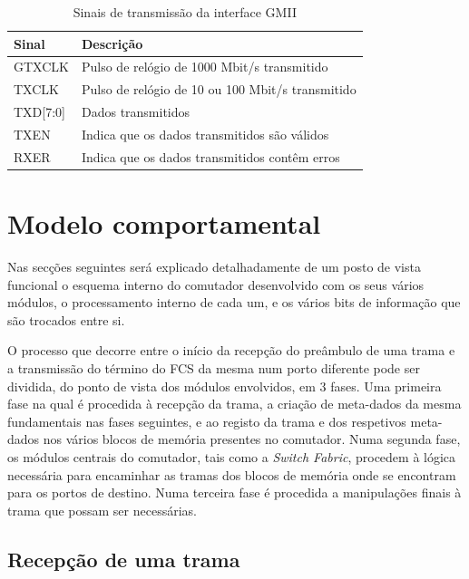 \begin{table}[h]
\begin{center}
\begin{tabular}{|l|l|}

    \hline
    Sinal &  Descrição  \\
    \hline
    GTXCLK &  Pulso de relógio de 1000 Mbit/s transmitido  \\
    \hline
    TXCLK &  Pulso de relógio de 10 ou 100 Mbit/s transmitido  \\
    \hline
    TXD[7:0] & Dados transmitidos \\
    \hline
    TXEN & Indica que os dados transmitidos são válidos \\
    \hline
    RXER & Indica que os dados transmitidos contêm erros \\
    \hline
    
\end{tabular}
\end{center}
\caption{Sinais de transmissão da interface GMII}\label{Sinais de transmissão do GMII}
\end{table}


\section{Modelo comportamental}

Nas secções seguintes será explicado detalhadamente de um posto de vista funcional o esquema interno do comutador desenvolvido com os seus vários módulos, o processamento interno de cada um, e os vários bits de informação que são trocados entre si. \par
O processo que decorre entre o início da recepção do preâmbulo de uma trama e a transmissão do término do FCS da mesma num porto diferente pode ser dividida, do ponto de vista dos módulos envolvidos, em 3 fases. Uma primeira fase na qual é procedida à recepção da trama, a criação de meta-dados da mesma fundamentais nas fases seguintes, e ao registo da trama e dos respetivos meta-dados nos vários blocos de memória presentes no comutador. Numa segunda fase, os módulos centrais do comutador, tais como a \textit{Switch Fabric}, procedem à lógica necessária para encaminhar as tramas dos blocos de memória onde se encontram para os portos de destino. Numa terceira fase é procedida a manipulações finais à trama que possam ser necessárias.   


\subsection{Recepção de uma trama}

